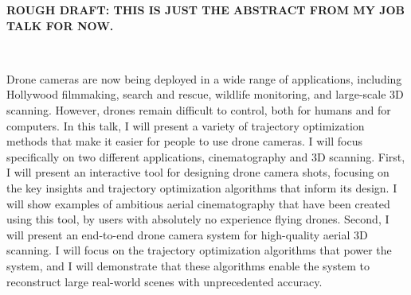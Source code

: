 
\textbf{ROUGH DRAFT: THIS IS JUST THE ABSTRACT FROM MY JOB TALK FOR NOW.}

~

\hspace{-15pt}Drone cameras are now being deployed in a wide range of applications, including Hollywood filmmaking, search and rescue, wildlife monitoring, and large-scale 3D scanning.
However, drones remain difficult to control, both for humans and for computers.
In this talk, I will present a variety of trajectory optimization methods that make it easier for people to use drone cameras.
I will focus specifically on two different applications, cinematography and 3D scanning.
First, I will present an interactive tool for designing drone camera shots, focusing on the key insights and trajectory optimization algorithms that inform its design.
I will show examples of ambitious aerial cinematography that have been created using this tool, by users with absolutely no experience flying drones.
Second, I will present an end-to-end drone camera system for high-quality aerial 3D scanning.
I will focus on the trajectory optimization algorithms that power the system, and I will demonstrate that these algorithms enable the system to reconstruct large real-world scenes with unprecedented accuracy.

